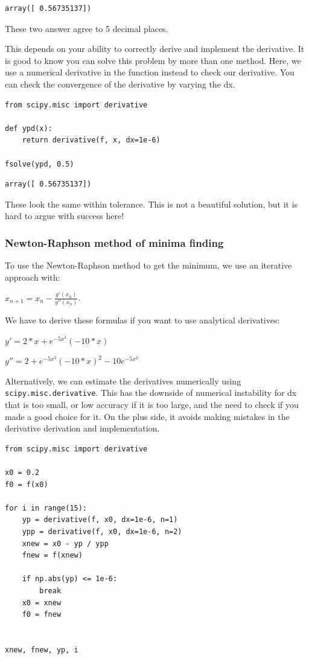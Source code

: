 \documentclass[11pt]{article}
\begin{document}
\begin{verbatim}
array([ 0.56735137])
\end{verbatim}

These two answer agree to 5 decimal places.

This depends on your ability to correctly derive and implement the derivative. It is good to know you can solve this problem by more than one method. Here, we use a numerical derivative in the function instead to check our derivative. You can check the convergence of the derivative by varying the dx.

\begin{verbatim}
from scipy.misc import derivative

def ypd(x):
    return derivative(f, x, dx=1e-6)

fsolve(ypd, 0.5)
\end{verbatim}

\begin{verbatim}
array([ 0.56735137])
\end{verbatim}

These look the same within tolerance. This is not a beautiful solution, but it is hard to argue with success here!

\subsubsection{Newton-Raphson method of minima finding}
\label{sec:orgaaff89a}

To use the Newton-Raphson method to get the minimum, we use an iterative approach with:

\(x_{n+1} = x_n - \frac{y'(x_n)}{y''(x_n)}\).

We have to derive these formulas if you want to use analytical derivatives:

\(y' = 2 * x + e^{-5 x^2} (-10 * x)\)

\(y'' = 2 + e^{-5 x^2} (-10 * x)^2 - 10 e^{-5 x^2}\)

Alternatively, we can estimate the derivatives numerically using \texttt{scipy.misc.derivative}. This has the downside of numerical instability for dx that is too small, or low accuracy if it is too large, and the need to check if you made a good choice for it. On the plus side, it avoids making mistakes in the derivative derivation and implementation.

\begin{verbatim}
from scipy.misc import derivative

x0 = 0.2
f0 = f(x0)

for i in range(15):
    yp = derivative(f, x0, dx=1e-6, n=1)
    ypp = derivative(f, x0, dx=1e-6, n=2)
    xnew = x0 - yp / ypp
    fnew = f(xnew)

    if np.abs(yp) <= 1e-6:
        break
    x0 = xnew
    f0 = fnew


xnew, fnew, yp, i
\end{verbatim}
\end{document}

